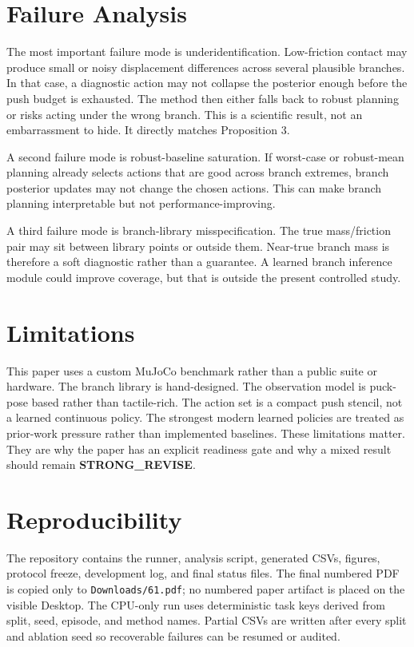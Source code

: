 \documentclass{article}
\begin{document}
\section{Failure Analysis}

The most important failure mode is underidentification.  Low-friction contact may produce small or noisy displacement differences across several plausible branches.  In that case, a diagnostic action may not collapse the posterior enough before the push budget is exhausted.  The method then either falls back to robust planning or risks acting under the wrong branch.  This is a scientific result, not an embarrassment to hide.  It directly matches Proposition 3.

A second failure mode is robust-baseline saturation.  If worst-case or robust-mean planning already selects actions that are good across branch extremes, branch posterior updates may not change the chosen actions.  This can make branch planning interpretable but not performance-improving.

A third failure mode is branch-library misspecification.  The true mass/friction pair may sit between library points or outside them.  Near-true branch mass is therefore a soft diagnostic rather than a guarantee.  A learned branch inference module could improve coverage, but that is outside the present controlled study.

\section{Limitations}

This paper uses a custom MuJoCo benchmark rather than a public suite or hardware.  The branch library is hand-designed.  The observation model is puck-pose based rather than tactile-rich.  The action set is a compact push stencil, not a learned continuous policy.  The strongest modern learned policies are treated as prior-work pressure rather than implemented baselines.  These limitations matter.  They are why the paper has an explicit readiness gate and why a mixed result should remain \textbf{STRONG\_REVISE}.

\section{Reproducibility}

The repository contains the runner, analysis script, generated CSVs, figures, protocol freeze, development log, and final status files.  The final numbered PDF is copied only to \texttt{Downloads/61.pdf}; no numbered paper artifact is placed on the visible Desktop.  The CPU-only run uses deterministic task keys derived from split, seed, episode, and method names.  Partial CSVs are written after every split and ablation seed so recoverable failures can be resumed or audited.
\end{document}
